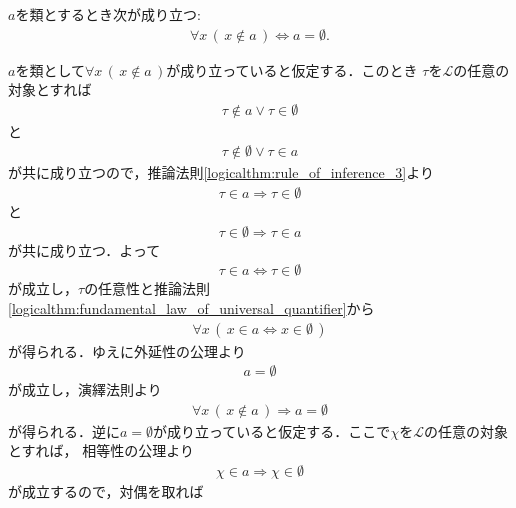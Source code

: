 	\begin{screen}
		\begin{thm}
		\label{thm:uniqueness_of_emptyset}
			$a$を類とするとき次が成り立つ:
			\begin{align}
				\forall x\, (\, x \notin a\, ) \Longleftrightarrow a = \emptyset.
			\end{align}
		\end{thm}
	\end{screen}
	
	\begin{prf}
		$a$を類として$\forall x\, (\, x \notin a\, )$が成り立っていると仮定する．このとき
		$\tau$を$\mathcal{L}$の任意の対象とすれば
		\begin{align}
			\tau \notin a \vee \tau \in \emptyset
		\end{align}
		と
		\begin{align}
			\tau \notin \emptyset \vee \tau \in a
		\end{align}
		が共に成り立つので，推論法則\ref{logicalthm:rule_of_inference_3}より
		\begin{align}
			\tau \in a \Longrightarrow \tau \in \emptyset
		\end{align}
		と
		\begin{align}
			\tau \in \emptyset \Longrightarrow \tau \in a
		\end{align}
		が共に成り立つ．よって
		\begin{align}
			\tau \in a \Longleftrightarrow \tau \in \emptyset
		\end{align}
		が成立し，$\tau$の任意性と推論法則\ref{logicalthm:fundamental_law_of_universal_quantifier}から
		\begin{align}
			\forall x\, (\, x \in a \Longleftrightarrow x \in \emptyset\, )
		\end{align}
		が得られる．ゆえに外延性の公理より
		\begin{align}
			a = \emptyset
		\end{align}
		が成立し，演繹法則より
		\begin{align}
			\forall x\, (\, x \notin a\, ) \Longrightarrow a = \emptyset
		\end{align}
		が得られる．逆に$a = \emptyset$が成り立っていると仮定する．ここで$\chi$を$\mathcal{L}$の任意の対象とすれば，
		相等性の公理より
		\begin{align}
			\chi \in a \Longrightarrow \chi \in \emptyset
		\end{align}
		が成立するので，対偶を取れば

\end{prf}
